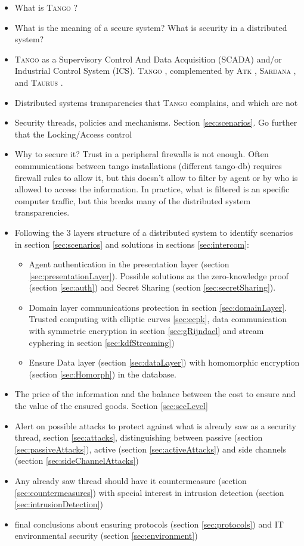 \documentclass[10pt,a4paper,twoside]{llncs}
\newcommand{\tango}{\textsc{Tango} }
\newcommand{\sardana}{\textsc{Sardana} }
\newcommand{\taurus}{\textsc{Taurus} }
\newcommand{\atk}{\textsc{Atk} }
\begin{document}
\begin{itemize}
 \item What is \tango?
 \item What is the meaning of a secure system? What is security in a distributed system?
 \item \tango as a Supervisory Control And Data Acquisition (SCADA) and/or Industrial Control System (ICS). \tango, complemented by \atk, \sardana, and \taurus.
  \item Distributed systems transparencies \cite{TanenbaumDistr} that \tango complains, and which are not
  
 \item Security threads, policies and mechanisms. Section \ref{sec:scenarios}. Go further that the Locking/Access control
  \item Why to secure it? Trust in a peripheral firewalls is not enough. Often communications between tango installations (different tango-db) requires firewall rules to allow it, but this doesn't allow to filter by agent or by who is allowed to access the information. In practice, what is filtered is an specific computer traffic, but this breaks many of the distributed system transparencies.
 
 \item Following the 3 layers structure of a distributed system \cite{TanenbaumDistr} to identify scenarios in section \ref{sec:scenarios} and solutions in sections \ref{sec:intercom}:
 \begin{itemize}
  \item Agent authentication in the presentation layer (section \ref{sec:presentationLayer}). Possible solutions as the zero-knowledge proof (section \ref{sec:auth}) and Secret Sharing (section \ref{sec:secretSharing}).
  \item Domain layer communications protection in section \ref{sec:domainLayer}. Trusted computing with elliptic curves \ref{sec:ecpk}, data communication with symmetric encryption in section \ref{sec:gRijndael} and stream cyphering in section \ref{sec:kdfStreaming})
  \item Ensure Data layer (section \ref{sec:dataLayer}) with homomorphic encryption (section \ref{sec:Homorph}) in the database.
 \end{itemize}
 \item The price of the information and the balance between the cost to ensure and the value of the ensured goods. Section \ref{sec:secLevel}
 \item Alert on possible attacks to protect against what is already saw as a security thread, section \ref{sec:attacks}, distinguishing between passive (section \ref{sec:passiveAttacks}), active (section \ref{sec:activeAttacks}) and side channels (section \ref{sec:sideChannelAttacks})
 \item Any already saw thread should have it countermeasure (section \ref{sec:countermeasures}) with special interest in intrusion detection (section \ref{sec:intrusionDetection})
 \item final conclusions about ensuring protocols (section \ref{sec:protocols}) and IT environmental security (section \ref{sec:environment})
\end{itemize}
\end{document}
